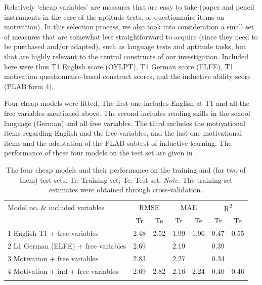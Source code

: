 \documentclass[output=paper]{langsci/langscibook}
\begin{document}
Relatively ‘cheap variables’ are measures that are easy to take (paper and pencil instruments in the case of the aptitude tests, or questionnaire items on motivation). In this selection process, we also took into consideration a small set of measures that are somewhat less straightforward to acquire (since they need to be purchased and/or adapted), such as language tests and aptitude tasks, but that are highly relevant to the central constructs of our investigation. Included here were thus T1 English score (OYLPT), T1 German score (ELFE), T1 motivation questionnaire-based construct scores, and the inductive ability score (PLAB form 4).

Four cheap models were fitted. The first one includes English at T1 and all the free variables mentioned above. The second includes reading skills in the school language (German) and all free variables. The third includes the motivational items regarding English and the free variables, and the last one motivational items and the adaptation of the PLAB subtest of inductive learning. The performance of these four models on the test set are given in . 


\begin{table}
\caption{The four cheap models and their performance on the training and (for two of them) test sets. Tr: Training set; Te: Test set. \emph{Note:} The training set estimates were obtained through cross-validation.\label{tab:04:3}}
\begin{tabular}{l cc cc cc}
\lsptoprule
 Model no. \& included variables & \multicolumn{2}{c}{RMSE} & \multicolumn{2}{c}{MAE} & \multicolumn{2}{c}{R\textsuperscript{2}}\\\cmidrule(lr){2-3}\cmidrule(lr){4-5}\cmidrule(lr){6-7}
                             &  Tr & Te &  Tr & Te &  Tr & Te\\\midrule
1 English T1 + free variables & 2.48 & 2.52 & 1.99 & 1.96 & 0.47 & 0.55\\
2 L1 German (ELFE) + free variables & 2.69 &  & 2.19 &  & 0.39 & \\
3 Motivation + free variables & 2.83 &  & 2.27 &  & 0.34 & \\
4 Motivation + ind + free variables & 2.69 & 2.82 & 2.16 & 2.24 & 0.40 & 0.46\\
\lspbottomrule
\end{tabular}
\textup{}
\end{table}
\end{document}
